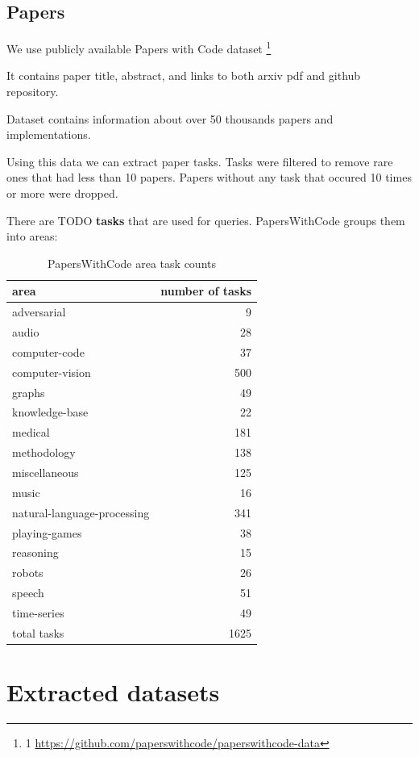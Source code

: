 \documentclass[11pt]{report}
\begin{document}
\subsection{Papers}

We use publicly available Papers with Code dataset \footnote{1 \url{https://github.com/paperswithcode/paperswithcode-data}}

It contains paper title, abstract, and links to both arxiv pdf and github repository.

Dataset contains information about over 50 thousands papers and implementations.

Using this data we can extract paper tasks. Tasks were filtered to remove rare ones that had less than 10 papers. Papers without any task that occured 10 times or more were dropped.

There are TODO \textbf{tasks} that are used for queries. PapersWithCode groups them into areas:

\begin{table}[htbp]
  \centering
  \caption{PapersWithCode area task counts}
  \begin{tabular}{|l|r|}
    \hline
    area & number of tasks\\
    \hline
    adversarial & 9\\
    audio & 28\\
    computer-code & 37\\
    computer-vision & 500\\
    graphs & 49\\
    knowledge-base & 22\\
    medical & 181\\
    methodology & 138\\
    miscellaneous & 125\\
    music & 16\\
    natural-language-processing & 341\\
    playing-games & 38\\
    reasoning & 15\\
    robots & 26\\
    speech & 51\\
    time-series & 49\\
    \hline
    total tasks & 1625\\
    \hline
  \end{tabular}
\end{table}

\section{Extracted datasets}
\end{document}
